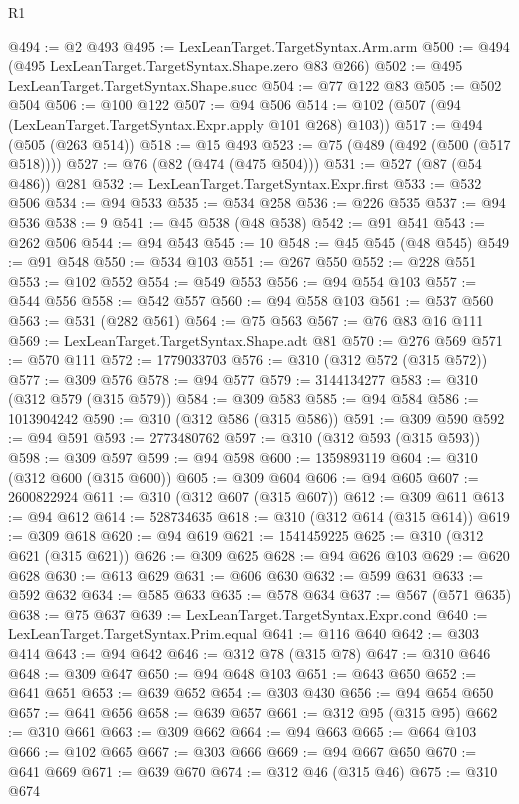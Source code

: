 \begin{lexlean}{R1}
\begin{coremodule}
@494 := @2 @493
@495 := LexLeanTarget.TargetSyntax.Arm.arm
@500 := @494 (@495 LexLeanTarget.TargetSyntax.Shape.zero @83 @266)
@502 := @495 LexLeanTarget.TargetSyntax.Shape.succ
@504 := @77 @122 @83
@505 := @502 @504
@506 := @100 @122
@507 := @94 @506
@514 := @102 (@507 (@94 (LexLeanTarget.TargetSyntax.Expr.apply @101 @268) @103))
@517 := @494 (@505 (@263 @514))
@518 := @15 @493
@523 := @75 (@489 (@492 (@500 (@517 @518))))
@527 := @76 (@82 (@474 (@475 @504)))
@531 := @527 (@87 (@54 @486)) @281
@532 := LexLeanTarget.TargetSyntax.Expr.first
@533 := @532 @506
@534 := @94 @533
@535 := @534 @258
@536 := @226 @535
@537 := @94 @536
@538 := 9
@541 := @45 @538 (@48 @538)
@542 := @91 @541
@543 := @262 @506
@544 := @94 @543
@545 := 10
@548 := @45 @545 (@48 @545)
@549 := @91 @548
@550 := @534 @103
@551 := @267 @550
@552 := @228 @551
@553 := @102 @552
@554 := @549 @553
@556 := @94 @554 @103
@557 := @544 @556
@558 := @542 @557
@560 := @94 @558 @103
@561 := @537 @560
@563 := @531 (@282 @561)
@564 := @75 @563
@567 := @76 @83 @16 @111
@569 := LexLeanTarget.TargetSyntax.Shape.adt @81
@570 := @276 @569
@571 := @570 @111
@572 := 1779033703
@576 := @310 (@312 @572 (@315 @572))
@577 := @309 @576
@578 := @94 @577
@579 := 3144134277
@583 := @310 (@312 @579 (@315 @579))
@584 := @309 @583
@585 := @94 @584
@586 := 1013904242
@590 := @310 (@312 @586 (@315 @586))
@591 := @309 @590
@592 := @94 @591
@593 := 2773480762
@597 := @310 (@312 @593 (@315 @593))
@598 := @309 @597
@599 := @94 @598
@600 := 1359893119
@604 := @310 (@312 @600 (@315 @600))
@605 := @309 @604
@606 := @94 @605
@607 := 2600822924
@611 := @310 (@312 @607 (@315 @607))
@612 := @309 @611
@613 := @94 @612
@614 := 528734635
@618 := @310 (@312 @614 (@315 @614))
@619 := @309 @618
@620 := @94 @619
@621 := 1541459225
@625 := @310 (@312 @621 (@315 @621))
@626 := @309 @625
@628 := @94 @626 @103
@629 := @620 @628
@630 := @613 @629
@631 := @606 @630
@632 := @599 @631
@633 := @592 @632
@634 := @585 @633
@635 := @578 @634
@637 := @567 (@571 @635)
@638 := @75 @637
@639 := LexLeanTarget.TargetSyntax.Expr.cond
@640 := LexLeanTarget.TargetSyntax.Prim.equal
@641 := @116 @640
@642 := @303 @414
@643 := @94 @642
@646 := @312 @78 (@315 @78)
@647 := @310 @646
@648 := @309 @647
@650 := @94 @648 @103
@651 := @643 @650
@652 := @641 @651
@653 := @639 @652
@654 := @303 @430
@656 := @94 @654 @650
@657 := @641 @656
@658 := @639 @657
@661 := @312 @95 (@315 @95)
@662 := @310 @661
@663 := @309 @662
@664 := @94 @663
@665 := @664 @103
@666 := @102 @665
@667 := @303 @666
@669 := @94 @667 @650
@670 := @641 @669
@671 := @639 @670
@674 := @312 @46 (@315 @46)
@675 := @310 @674

\end{coremodule}
\end{lexlean}
